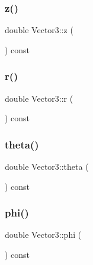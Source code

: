 \mbox{\label{class_vector3_aff9b42255ac1e08c52a5eda5a4513a48}} 
\subsubsection{\texorpdfstring{z()}{z()}}
{\footnotesize\ttfamily double Vector3\+::z (\begin{DoxyParamCaption}{ }\end{DoxyParamCaption}) const\hspace{0.3cm}{\ttfamily [inline]}}

\mbox{\label{class_vector3_acbf6dfc367121fd82a153c4593306145}} 
\subsubsection{\texorpdfstring{r()}{r()}}
{\footnotesize\ttfamily double Vector3\+::r (\begin{DoxyParamCaption}{ }\end{DoxyParamCaption}) const\hspace{0.3cm}{\ttfamily [inline]}}

\mbox{\label{class_vector3_a30c86ee94c98070b469a56fa4f7fde4f}} 
\subsubsection{\texorpdfstring{theta()}{theta()}}
{\footnotesize\ttfamily double Vector3\+::theta (\begin{DoxyParamCaption}{ }\end{DoxyParamCaption}) const\hspace{0.3cm}{\ttfamily [inline]}}

\mbox{\label{class_vector3_af04a3d08dae7f1ba36ee3feaf3bc8a4c}} 
\subsubsection{\texorpdfstring{phi()}{phi()}}
{\footnotesize\ttfamily double Vector3\+::phi (\begin{DoxyParamCaption}{ }\end{DoxyParamCaption}) const\hspace{0.3cm}{\ttfamily [inline]}}

